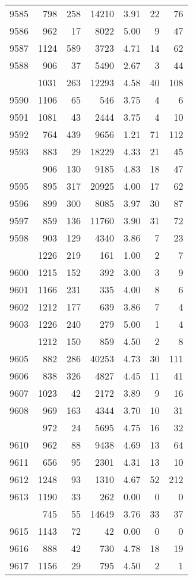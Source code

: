 \documentclass[
]{article}
\begin{document}
\begin{table}
\begin{tabular}[t]{lrrrrrr}
9585 & 798 & 258 & 14210 & 3.91 & 22 & 76\\
9586 & 962 & 17 & 8022 & 5.00 & 9 & 47\\
9587 & 1124 & 589 & 3723 & 4.71 & 14 & 62\\
9588 & 906 & 37 & 5490 & 2.67 & 3 & 44\\
\addlinespace
9589 & 1031 & 263 & 12293 & 4.58 & 40 & 108\\
9590 & 1106 & 65 & 546 & 3.75 & 4 & 6\\
9591 & 1081 & 43 & 2444 & 3.75 & 4 & 10\\
9592 & 764 & 439 & 9656 & 1.21 & 71 & 112\\
9593 & 883 & 29 & 18229 & 4.33 & 21 & 45\\
\addlinespace
9594 & 906 & 130 & 9185 & 4.83 & 18 & 47\\
9595 & 895 & 317 & 20925 & 4.00 & 17 & 62\\
9596 & 899 & 300 & 8085 & 3.97 & 30 & 87\\
9597 & 859 & 136 & 11760 & 3.90 & 31 & 72\\
9598 & 903 & 129 & 4340 & 3.86 & 7 & 23\\
\addlinespace
9599 & 1226 & 219 & 161 & 1.00 & 2 & 7\\
9600 & 1215 & 152 & 392 & 3.00 & 3 & 9\\
9601 & 1166 & 231 & 335 & 4.00 & 8 & 6\\
9602 & 1212 & 177 & 639 & 3.86 & 7 & 4\\
9603 & 1226 & 240 & 279 & 5.00 & 1 & 4\\
\addlinespace
9604 & 1212 & 150 & 859 & 4.50 & 2 & 8\\
9605 & 882 & 286 & 40253 & 4.73 & 30 & 111\\
9606 & 838 & 326 & 4827 & 4.45 & 11 & 41\\
9607 & 1023 & 42 & 2172 & 3.89 & 9 & 16\\
9608 & 969 & 163 & 4344 & 3.70 & 10 & 31\\
\addlinespace
9609 & 972 & 24 & 5695 & 4.75 & 16 & 32\\
9610 & 962 & 88 & 9438 & 4.69 & 13 & 64\\
9611 & 656 & 95 & 2301 & 4.31 & 13 & 10\\
9612 & 1248 & 93 & 1310 & 4.67 & 52 & 212\\
9613 & 1190 & 33 & 262 & 0.00 & 0 & 0\\
\addlinespace
9614 & 745 & 55 & 14649 & 3.76 & 33 & 37\\
9615 & 1143 & 72 & 42 & 0.00 & 0 & 0\\
9616 & 888 & 42 & 730 & 4.78 & 18 & 19\\
9617 & 1156 & 29 & 795 & 4.50 & 2 & 1\\
\bottomrule
\end{tabular}
\end{table}
\end{document}
